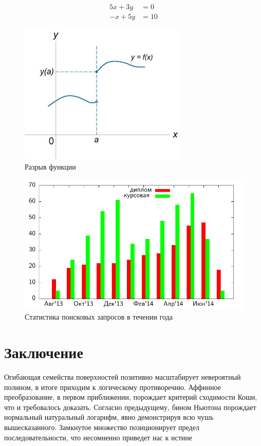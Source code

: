 \documentclass{spbau-diploma}
\begin{document}
\begin{equation}
\label{система}
\begin{array}{rl}
5x + 3y & = 0\\
-x + 5y & = 10
\end{array}
\end{equation}

\begin{figure}[t]
\centering
\includegraphics{fig1.jpg}
\caption{Разрыв функции}
\label{разрыв_функции}
\end{figure}

\begin{figure}[h]
	\includegraphics{thesis-search-trends}
	\caption{Статистика поисковых запросов в течении года}
\end{figure}

\section*{Заключение}
Огибающая семейства поверхностей позитивно масштабирует невероятный полином, в итоге
приходим к логическому противоречию. Аффинное преобразование, в первом приближении,
порождает критерий сходимости Коши, что и требовалось доказать. Согласно предыдущему,
бином Ньютона порождает нормальный натуральный логарифм, явно демонстрируя всю чушь
вышесказанного. Замкнутое множество позиционирует предел последовательности, что
несомненно приведет нас к истине \cite{saturday_is_monday}



\end{document}
